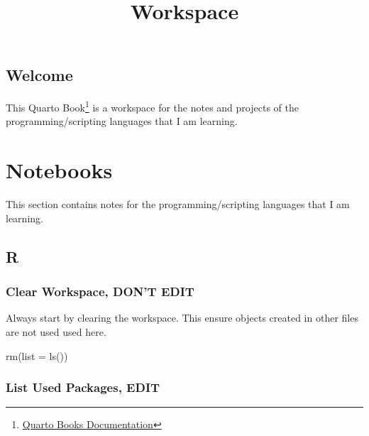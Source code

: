 \documentclass[
  letterpaper,
  DIV=11,
  numbers=noendperiod]{scrreprt}
\title{Workspace}
\author{}
\date{}
\newenvironment{Shaded}{\begin{snugshade}}{\end{snugshade}}
\newcommand{\AttributeTok}[1]{\textcolor[rgb]{0.40,0.45,0.13}{#1}}
\newcommand{\FunctionTok}[1]{\textcolor[rgb]{0.28,0.35,0.67}{#1}}
\newcommand{\NormalTok}[1]{\textcolor[rgb]{0.00,0.23,0.31}{#1}}
\renewcommand*\contentsname{Table of contents}
\newcommand\contentsname{Table of contents}
\begin{document}
\maketitle

\renewcommand*\contentsname{Table of contents}
{
\hypersetup{linkcolor=}
\setcounter{tocdepth}{2}
\tableofcontents
}

\chapter*{Welcome}\label{welcome}


This Quarto Book\footnote{\href{https://quarto.org/docs/books/}{Quarto
  Books Documentation}} is a workspace for the notes and projects of the
programming/scripting languages that I am learning.

\part{Notebooks}

This section contains notes for the programming/scripting languages that
I am learning.

\chapter{R}\label{r}

\section*{Clear Workspace, DON'T EDIT}\label{clear-workspace-dont-edit}


Always start by clearing the workspace. This ensure objects created in
other files are not used used here.

\begin{Shaded}
\begin{Highlighting}[]
\FunctionTok{rm}\NormalTok{(}\AttributeTok{list =} \FunctionTok{ls}\NormalTok{())}
\end{Highlighting}
\end{Shaded}

\section*{List Used Packages, EDIT}\label{list-used-packages-edit}
\end{document}
